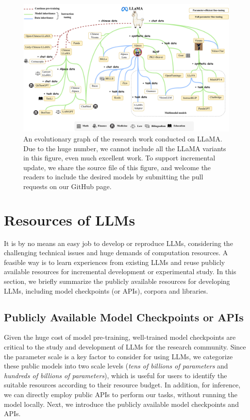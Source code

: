\begin{figure}
    \centering
    \includegraphics[width=\textwidth]{images/llama-0628-final.pdf}
    \caption{An evolutionary graph of the research  work conducted on LLaMA. Due to the huge number, we cannot include  all the LLaMA variants in this figure, even much excellent work. To support incremental update, we share the source file of this figure, and welcome the readers to include the desired models by submitting the pull requests on our GitHub page. }
    \label{fig:llama_family}
    
\end{figure}

 

\section{Resources of LLMs}
\label{sec-resource}
It is by no means an easy job  to develop or reproduce LLMs, considering the challenging technical issues and huge demands of computation resources.  
A feasible way is to learn experiences from existing LLMs and reuse publicly available resources for incremental development or experimental study.  In this section, we briefly summarize the publicly available resources for developing LLMs, including model checkpoints (or APIs), corpora and libraries.



\subsection{Publicly Available Model Checkpoints or APIs}\label{subsec-models-apis}
Given the huge cost of model pre-training, well-trained model checkpoints are critical to the study and development  of LLMs  for the research community. Since the parameter scale is a key factor to consider for using LLMs, we categorize these public models into two scale levels (\ie \emph{tens of billions of parameters} and  \emph{hundreds of billions of parameters}), 
which is useful for  users to identify the suitable resources according to their resource budget.    In addition, for inference, we can directly employ public APIs to perform  our tasks, without running the model 
{locally}.  Next, we introduce the publicly available model checkpoints and APIs. 



